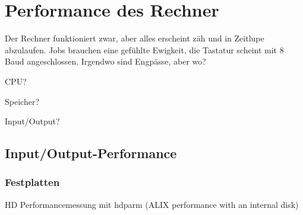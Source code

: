 \chapter{Performance des Rechner}
\label{cha:lokal-performance}

\begin{abstractsec}
  Der Rechner funktioniert zwar, aber alles erscheint zäh und in Zeitlupe
  abzulaufen. Jobs brauchen eine gefühlte Ewigkeit, die Tastatur scheint mit
  8 Baud angeschlossen. Irgendwo sind Engpässe, aber wo?
\end{abstractsec}

\begin{notes}
\item CPU?
\item Speicher?
\item Input/Output?
\end{notes}

\section{Input/Output-Performance}
\label{sec:input-output-performance}


\subsection{Festplatten}
\label{sec:performance-festplatten}

\begin{notes}
\item HD Performancemessung mit hdparm (ALIX performance with an
  internal disk)
\end{notes}



